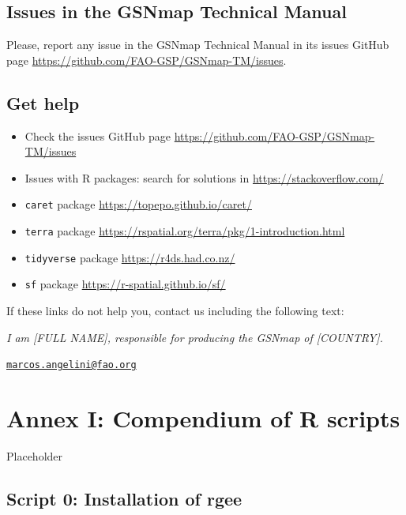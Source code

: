 \documentclass[
  10pt,
  b5paper,
  oneside]{book}
\providecommand{\tightlist}{%
  \setlength{\itemsep}{0pt}\setlength{\parskip}{0pt}}
\begin{document}
\hypertarget{issues-in-the-gsnmap-technical-manual}{%
\section{Issues in the GSNmap Technical Manual}\label{issues-in-the-gsnmap-technical-manual}}

Please, report any issue in the GSNmap Technical Manual in its issues GitHub page \url{https://github.com/FAO-GSP/GSNmap-TM/issues}.

\hypertarget{get-help}{%
\section{Get help}\label{get-help}}

\begin{itemize}
\tightlist
\item
  Check the issues GitHub page \url{https://github.com/FAO-GSP/GSNmap-TM/issues}
\item
  Issues with R packages: search for solutions in \url{https://stackoverflow.com/}
\item
  \texttt{caret} package \url{https://topepo.github.io/caret/}
\item
  \texttt{terra} package \url{https://rspatial.org/terra/pkg/1-introduction.html}
\item
  \texttt{tidyverse} package \url{https://r4ds.had.co.nz/}
\item
  \texttt{sf} package \url{https://r-spatial.github.io/sf/}
\end{itemize}

If these links do not help you, contact us including the following text:

\emph{I am {[}FULL NAME{]}, responsible for producing the GSNmap of {[}COUNTRY{]}.}

\href{mailto:marcos.angelini@fao.org}{\nolinkurl{marcos.angelini@fao.org}}

\hypertarget{annex-i-compendium-of-r-scripts}{%
\chapter*{Annex I: Compendium of R scripts}\label{annex-i-compendium-of-r-scripts}}

Placeholder

\hypertarget{script-0-installation-of-rgee}{%
\section*{Script 0: Installation of rgee}\label{script-0-installation-of-rgee}}
\end{document}
